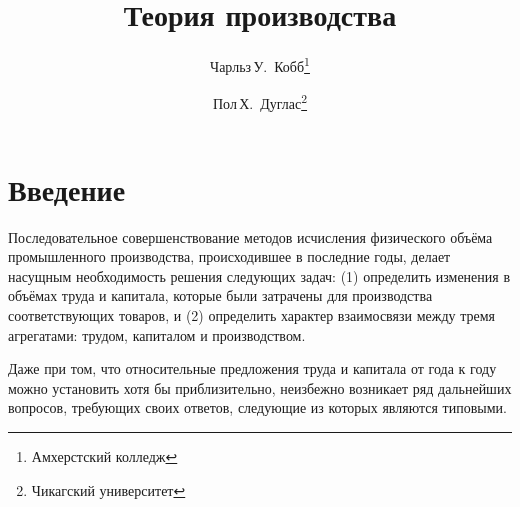 \documentclass[leqno]{article}  %
\title{
    \renewcommand*{\thefootnote}{\arabic{footnote}}
    Теория производства{}\footnotemark
}
\author{
    \renewcommand*{\thefootnote}{\fnsymbol{footnote}}
    Чарльз\,У.~Кобб\thanks{Амхерстский колледж} \and Пол\,Х.~Дуглас\thanks{Чикагский университет}
}
\begin{document}
\maketitle

\setcounter{footnote}{1}

\section{Введение}

Последовательное совершенствование методов исчисления физического объёма промышленного производства, происходившее в последние годы, делает насущным необходимость решения следующих задач: (1) определить изменения в объёмах труда и капитала, которые были затрачены для производства соответствующих товаров, и (2) определить характер взаимосвязи между тремя агрегатами: трудом, капиталом и производством.
\par
Даже при том, что относительные предложения труда и капитала от года к году можно установить хотя бы приблизительно, неизбежно возникает ряд дальнейших вопросов, требующих своих ответов, следующие из которых являются типовыми. 
\end{document}
